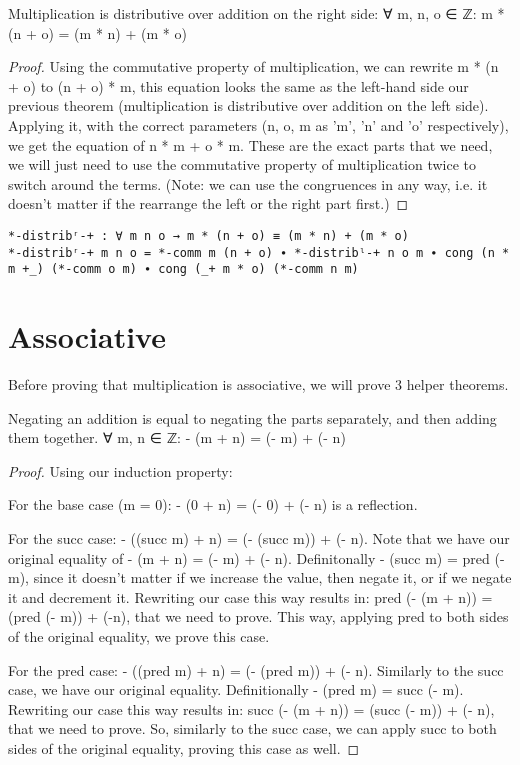 \begin{theorem}
  Multiplication is distributive over addition on the right side: ∀ m, n, o ∈ ℤ: m * (n + o) = (m * n) + (m * o)
\end{theorem}

\begin{proof}
  Using the commutative property of multiplication, we can rewrite m * (n + o) to (n + o) * m, this equation looks the same as the left-hand side our previous theorem (multiplication is distributive over addition on the left side). Applying it, with the correct parameters (n, o, m as 'm', 'n' and 'o' respectively), we get the equation of n * m + o * m. These are the exact parts that we need, we will just need to use the commutative property of multiplication twice to switch around the terms. (Note: we can use the congruences in any way, i.e. it doesn't matter if the rearrange the left or the right part first.)
\end{proof}

\begin{listing}[H]
\begin{verbatim}
*-distribʳ-+ : ∀ m n o → m * (n + o) ≡ (m * n) + (m * o)
*-distribʳ-+ m n o = *-comm m (n + o) ∙ *-distribˡ-+ n o m ∙ cong (n * m +_) (*-comm o m) ∙ cong (_+ m * o) (*-comm n m)
\end{verbatim}
\caption{Agda proof of multiplication being right distributive to addition}
\end{listing}

\section{Associative}
Before proving that multiplication is associative, we will prove 3 helper theorems.

\begin{theorem}
  Negating an addition is equal to negating the parts separately, and then adding them together. ∀ m, n ∈ ℤ: - (m + n) = (- m) + (- n)
\end{theorem}

\begin{proof}
  Using our induction property:

  For the base case (m = 0): - (0 + n) = (- 0) + (- n) is a reflection.

  For the succ case: - ((succ m) + n) = (- (succ m)) + (- n). Note that we have our original equality of - (m + n) = (- m) + (- n). Definitonally - (succ m) = pred (- m), since it doesn't matter if we increase the value, then negate it, or if we negate it and decrement it. Rewriting our case this way results in: pred (- (m + n)) = (pred (- m)) + (-n), that we need to prove. This way, applying pred to both sides of the original equality, we prove this case.

  For the pred case: - ((pred m) + n) = (- (pred m)) + (- n). Similarly to the succ case, we have our original equality. Definitionally - (pred m) = succ (- m). Rewriting our case this way results in: succ (- (m + n)) = (succ (- m)) + (- n), that we need to prove. So, similarly to the succ case, we can apply succ to both sides of the original equality, proving this case as well.
\end{proof}

